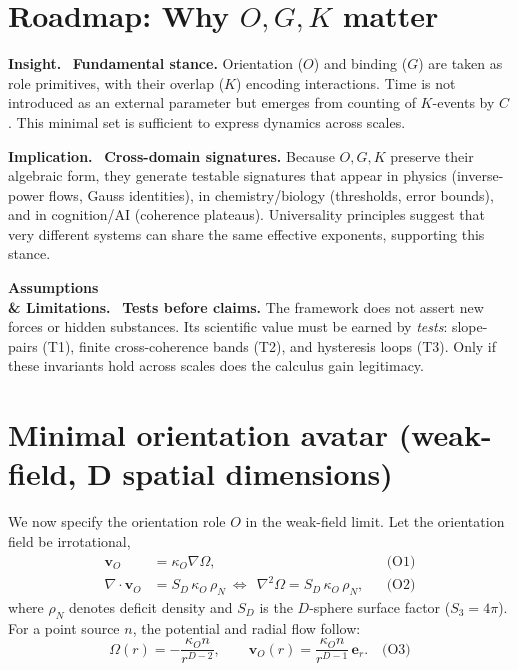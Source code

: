 \documentclass[12pt,a4paper,oneside]{scrreprt}
\def\({}%
\def\){}%
\newenvironment{insight}{\par\vspace{0.5em}\noindent\textbf{Insight.}\ }{\par\vspace{0.5em}}
\newenvironment{implication}{\par\vspace{0.5em}\noindent\textbf{Implication.}\ }{\par\vspace{0.5em}}
\newenvironment{limitation}{\par\vspace{0.5em}\noindent\textbf{Assumptions \\ \& Limitations.}\ }{\par\vspace{0.5em}}
\begin{document}
\section*{Roadmap: Why $O,G,K$ matter}
\begin{insight}
\textbf{Fundamental stance.} 
Orientation ($O$) and binding ($G$) are taken as role primitives, 
with their overlap ($K$) encoding interactions. 
Time is not introduced as an external parameter but emerges from counting 
of $K$-events by $C$. 
This minimal set is sufficient to express dynamics across scales.
\end{insight}

\begin{implication}
\textbf{Cross-domain signatures.} 
Because $O,G,K$ preserve their algebraic form, they generate testable 
signatures that appear in physics (inverse-power flows, Gauss identities), 
in chemistry/biology (thresholds, error bounds), and in cognition/AI 
(coherence plateaus). 
Universality principles \citep{Wilson1971RG} suggest that very different 
systems can share the same effective exponents, supporting this stance.
\end{implication}

\begin{limitation}
\textbf{Tests before claims.} 
The framework does not assert new forces or hidden substances. 
Its scientific value must be earned by \emph{tests}:  
slope-pairs (T1), finite cross-coherence bands (T2), and hysteresis loops (T3). 
Only if these invariants hold across scales does the calculus gain legitimacy.
\end{limitation}

\section{Minimal orientation avatar (weak-field, \(D\) spatial dimensions)}\label{sec:ur-orientation}

We now specify the orientation role $O$ in the weak-field limit. 
Let the orientation field be irrotational,
\begin{align}
\mathbf v_O &= \kappa_O \nabla \Omega, && \text{(O1)}\\
\nabla \!\cdot \mathbf v_O &= S_D \, \kappa_O \, \rho_N 
\ \Longleftrightarrow\ \ \nabla^2 \Omega = S_D \, \kappa_O \, \rho_N, && \text{(O2)}
\end{align}
where $\rho_N$ denotes deficit density and $S_D$ is the $D$-sphere surface factor 
($S_3 = 4\pi$). 
For a point source $n$, the potential and radial flow follow:
\begin{equation}
\Omega(r) = -\frac{\kappa_O n}{r^{D-2}}, 
\qquad 
\mathbf v_O(r) = \frac{\kappa_O n}{r^{D-1}} \, \mathbf e_r. 
\quad \text{(O3)}
\end{equation}
\end{document}
